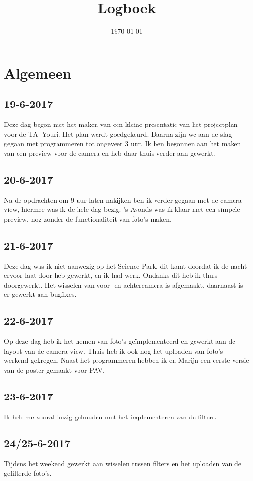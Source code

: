 \documentclass{uva-inf-article}
\title{Logboek}
\date{\today}
\begin{document}
\maketitle

\section{Algemeen}
\subsection{19-6-2017}
Deze dag begon met het maken van een kleine presentatie van het projectplan
voor de TA, Youri. Het plan werdt goedgekeurd. Daarna zijn we aan de slag
gegaan met programmeren tot ongeveer 3 uur. Ik ben begonnen aan het maken van 
een preview voor de camera en heb daar thuis verder aan gewerkt.
\subsection{20-6-2017}
Na de opdrachten om 9 uur laten nakijken ben ik verder gegaan met de camera
view, hiermee was ik de hele dag bezig. 's Avonds was ik klaar met een simpele
preview, nog zonder de functionaliteit van foto's maken.
\subsection{21-6-2017}
Deze dag was ik niet aanwezig op het Science Park, dit komt doordat ik de
nacht ervoor laat door heb gewerkt, en ik had werk. Ondanks dit heb ik thuis
doorgewerkt. Het wisselen van voor- en achtercamera is afgemaakt, daarnaast is
er gewerkt aan bugfixes.
\subsection{22-6-2017}
Op deze dag heb ik het nemen van foto's geïmplementeerd en gewerkt aan de
layout van de camera view. Thuis heb ik ook nog het uploaden van foto's
werkend gekregen.
Naast het programmeren hebben ik en Marijn een eerste versie van de poster
gemaakt voor PAV.
\subsection{23-6-2017}
Ik heb me vooral bezig gehouden met het implementeren van de filters.
\subsection{24/25-6-2017}
Tijdens het weekend gewerkt aan wisselen tussen filters en het uploaden van de
gefilterde foto's.
\end{document}
